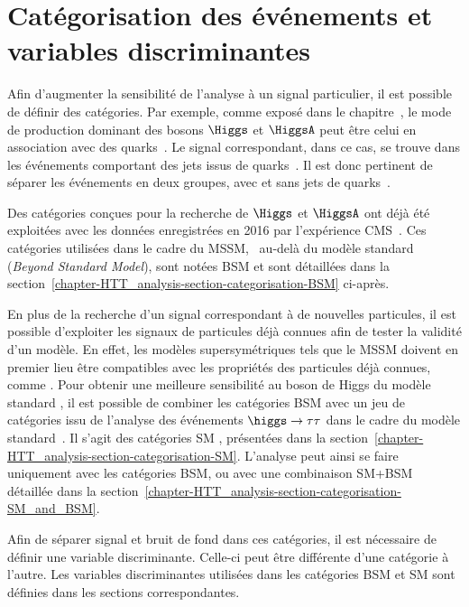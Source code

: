 \section{Catégorisation des événements et variables discriminantes}\label{chapter-HTT_analysis-section-categorisation}
Afin d'augmenter la sensibilité de l'analyse à un signal particulier, il est possible de définir des catégories.
Par exemple, comme exposé dans le chapitre~, le mode de production dominant des bosons $\Higgs$ et $\HiggsA$ peut être celui en association avec des quarks~\quarkb.
Le signal correspondant, dans ce cas, se trouve dans les événements comportant des jets issus de quarks~\quarkb.
Il est donc pertinent de séparer les événements en deux groupes, avec et sans jets de quarks~\quarkb.
\par
Des catégories conçues pour la recherche de $\Higgs$ et $\HiggsA$ ont déjà été exploitées avec les données enregistrées en 2016 par l'expérience CMS~\cite{CMS-PAS-HIG-17-020}.
Ces catégories utilisées dans le cadre du MSSM, \ie\ au-delà du modèle standard (\emph{Beyond Standard Model}), sont notées \og BSM \fg{} et sont détaillées dans la section~\ref{chapter-HTT_analysis-section-categorisation-BSM} ci-après.
\par
En plus de la recherche d'un signal correspondant à de nouvelles particules, il est possible d'exploiter les signaux de particules déjà connues afin de tester la validité d'un modèle.
En effet, les modèles supersymétriques tels que le MSSM doivent en premier lieu être compatibles avec les propriétés des particules déjà connues, comme \higgs.
Pour obtenir une meilleure sensibilité au boson de Higgs du modèle standard \higgs, il est possible de combiner les catégories BSM avec un jeu de catégories issu de l'analyse des événements $\higgs\to\tau\tau$ dans le cadre du modèle standard~\cite{CMS-PAS-HIG-19-010,CMS-NOTE-2019-177,CMS-NOTE-2019-178}.
Il s'agit des catégories \og SM \fg, présentées dans la section~\ref{chapter-HTT_analysis-section-categorisation-SM}.
L'analyse peut ainsi se faire uniquement avec les catégories BSM, ou avec une combinaison SM+BSM détaillée dans la section~\ref{chapter-HTT_analysis-section-categorisation-SM_and_BSM}.
\par
Afin de séparer signal et bruit de fond dans ces catégories, il est nécessaire de définir une variable discriminante.
Celle-ci peut être différente d'une catégorie à l'autre.
Les variables discriminantes utilisées dans les catégories BSM et SM sont définies dans les sections correspondantes.



